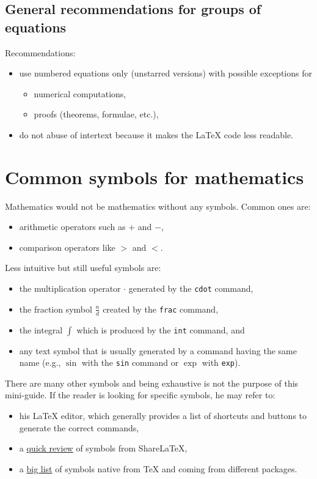 	
	
	\subsection{General recommendations for groups of equations}
	
		Recommendations:
		\begin{itemize}
			\item use numbered equations only (unstarred versions) with possible exceptions for
			\begin{itemize}
				\item numerical computations,
				\item proofs (theorems, formulae, etc.),
			\end{itemize}
			\item do not abuse of intertext because it makes the \LaTeX{} code less readable.
		\end{itemize}



\section{Common symbols for mathematics}

	Mathematics would not be mathematics without any symbols.
	Common ones are:
	\begin{itemize}
		\item arithmetic operators such as $+$ and $-$,
		\item comparison operators like $>$ and $<$.
	\end{itemize}

	Less intuitive but still useful symbols are:
	\begin{itemize}
		\item the multiplication operator $\cdot$ generated by the \texttt{cdot} command,
		\item the fraction symbol $\frac{n}{d}$ created by the \texttt{frac} command,
		\item the integral $\int$ which is produced by the \texttt{int} command, and
		\item any text symbol that is usually generated by a command having the same name (e.g., $\sin$ with the \texttt{sin} command or $\exp$ with \texttt{exp}).
	\end{itemize}
	
	There are many other symbols and being exhaustive is not the purpose of this mini-guide.
	If the reader is looking for specific symbols, he may refer to:
	\begin{itemize}
		\item his \LaTeX{} editor, which generally provides a list of shortcuts and buttons to generate the correct commands,
		\item a \href{https://fr.sharelatex.com/learn/List_of_Greek_letters_and_math_symbols}{quick review} of symbols from ShareLaTeX,
		\item a \href{http://www.rpi.edu/dept/arc/training/latex/LaTeX_symbols.pdf}{big list} of symbols native from \TeX{} and coming from different packages.
	\end{itemize}


